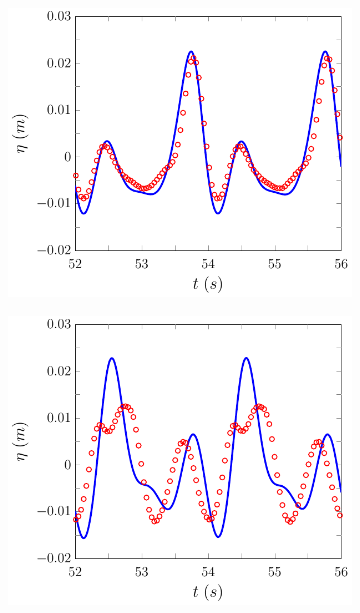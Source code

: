 \begin{figure}
	\centering
	\begin{subfigure}{0.5\textwidth}
		\includegraphics[width=\textwidth]{./chp6/figures/Experiment/Beji/sl/FEVMWG5.pdf}
		\vspace{0.5cm}
	\end{subfigure}%
	\begin{subfigure}{0.5\textwidth}
		\includegraphics[width=\textwidth]{./chp6/figures/Experiment/Beji/sl/FEVMWG6.pdf}

\end{subfigure}
\end{figure}
